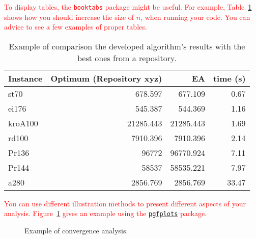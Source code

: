 \documentclass{scrartcl}
\begin{document}
\textcolor{red}{To display tables, the \texttt{booktabs} package might be useful. For example, Table~\ref{tab:results_example} shows how you should increase the  size of $n$, when running your code. You can advice \cite{zobel2014graphs} to see a few examples of proper tables.}

\begin{table}[ht]
\centering
\caption{Example of comparison the developed algorithm's results with the best ones from a repository.}
\label{tab:results_example}
	\begin{tabular}{lrrr}
	\toprule
	\textbf{Instance} & \textbf{Optimum (Repository xyz)} & \textbf{EA} & \textbf{time (s)}\\
	\midrule
	st70       &  678.597      & 677.109	& 0.67\\
	ei176      &  545.387      & 544.369	& 1.16\\
	kroA100    &  21285.443    & 21285.443	& 1.69\\
	rd100      &  7910.396     & 7910.396	& 2.14\\
	Pr136      &  96772        & 96770.924	& 7.11\\
	Pr144      &  58537        & 58535.221	& 7.97\\
	a280       &  2856.769     & 2856.769	& 33.47\\
	\bottomrule
	\end{tabular}
\end{table}

\textcolor{red}{You can use different illustration methods to present different aspects of your analysis. Figure~\ref{fig:plot_example} gives an example using the \href{https://www.overleaf.com/learn/latex/Pgfplots_package}{\texttt{pgfplots}} package.}

\begin{figure}[ht]
\centering
{}
\caption{Example of convergence analysis.}
\label{fig:plot_example}
\end{figure}
\end{document}
